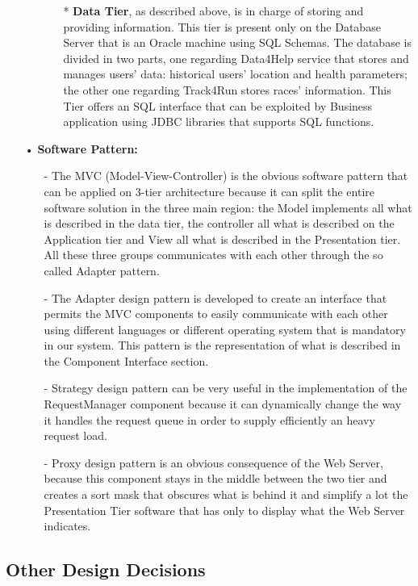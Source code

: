 \begin{enumerate}
\begin{enumerate}
\begin{enumerate}
	\item[*] \textbf{Data Tier}, as described above, is in charge of storing and providing information. This tier is present only on the Database Server that is an Oracle machine using SQL Schemas. The database is divided in two parts, one regarding Data4Help service that stores and manages users' data: historical users' location and health parameters; the other one regarding Track4Run stores races' information. This Tier offers an SQL interface that can be exploited by Business application using JDBC libraries that supports SQL functions.
		\end{enumerate}
	
	\end{enumerate}

\item[•] \textbf{Software Pattern: }

	\begin{enumerate}
	\item[-] The MVC (Model-View-Controller) is the obvious software pattern that can be applied on 3-tier architecture because it can split the entire software solution in the three main region: the Model implements all what is described in the data tier, the controller all what is described on the Application tier and View all what is described in the Presentation tier. All these three groups communicates with each other through the so called Adapter pattern.
	\item[-] The Adapter design pattern is developed to create an interface that permits the MVC components to easily communicate with each other using different languages or different operating system that is mandatory in our system. This pattern is the representation of what is described in the Component Interface section.
	\item[-] Strategy design pattern can be very useful in the implementation of the RequestManager component because it can dynamically change the way it handles the request queue in order to supply efficiently an heavy request load.
	\item[-] Proxy design pattern is an obvious consequence of the Web Server, because this component stays in the middle between the two tier and creates a sort mask that obscures what is behind it and simplify a lot the Presentation Tier software that has only to display what the Web Server indicates.
	\end{enumerate}

\end{enumerate}


\subsection{Other Design Decisions}